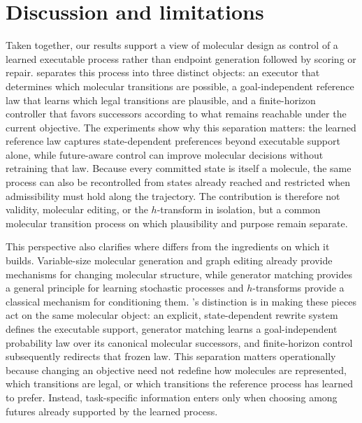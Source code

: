 \section{Discussion and limitations}
\label{sec:discussion}

Taken together, our results support a view of molecular design as control of a learned executable process rather than endpoint generation followed by scoring or repair. \method{} separates this process into three distinct objects: an executor that determines which molecular transitions are possible, a goal-independent reference law that learns which legal transitions are plausible, and a finite-horizon controller that favors successors according to what remains reachable under the current objective. The experiments show why this separation matters: the learned reference law captures state-dependent preferences beyond executable support alone, while future-aware control can improve molecular decisions without retraining that law. Because every committed state is itself a molecule, the same process can also be recontrolled from states already reached and restricted when admissibility must hold along the trajectory. The contribution is therefore not validity, molecular editing, or the $h$-transform in isolation, but a common molecular transition process on which plausibility and purpose remain separate.

This perspective also clarifies where \method{} differs from the ingredients on which it builds. Variable-size molecular generation and graph editing already provide mechanisms for changing molecular structure, while generator matching provides a general principle for learning stochastic processes and $h$-transforms provide a classical mechanism for conditioning them. \method{}'s distinction is in making these pieces act on the same molecular object: an explicit, state-dependent rewrite system defines the executable support, generator matching learns a goal-independent probability law over its canonical molecular successors, and finite-horizon control subsequently redirects that frozen law. This separation matters operationally because changing an objective need not redefine how molecules are represented, which transitions are legal, or which transitions the reference process has learned to prefer. Instead, task-specific information enters only when choosing among futures already supported by the learned process.

